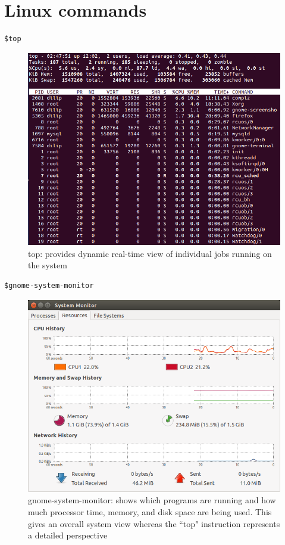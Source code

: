 \documentclass{sem5}
\begin{document}
\section*{Linux commands}
\lstset{language=C}
\begin{lstlisting}[frame=single]
$top
\end{lstlisting}
\begin{figure}[htp]
\centering
\includegraphics[scale=.4]{1.png}
\caption{top: provides dynamic real-time view of individual jobs running on the system}
\end{figure}
\begin{lstlisting}[frame=single]
$gnome-system-monitor
\end{lstlisting}
\begin{figure}[!htp]
\centering
\includegraphics[scale=.5]{2.png}
\caption{gnome-system-monitor: shows which programs are running and how much processor time, memory, and disk space are being used. This gives an overall system view whereas the ``top" instruction represents a detailed perspective}
\end{figure}
\end{document}
